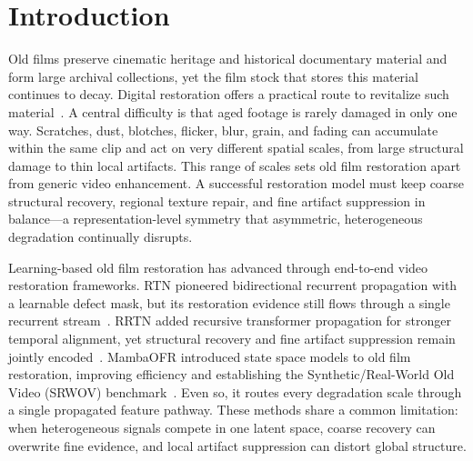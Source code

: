 \section{Introduction}
\label{sec:introduction}

Old films preserve cinematic heritage and historical documentary material and form large archival collections, yet the film stock that stores this material continues to decay. Digital restoration offers a practical route to revitalize such material~\cite{iizuka2019deepremaster}. A central difficulty is that aged footage is rarely damaged in only one way. Scratches, dust, blotches, flicker, blur, grain, and fading can accumulate within the same clip and act on very different spatial scales, from large structural damage to thin local artifacts. This range of scales sets old film restoration apart from generic video enhancement. A successful restoration model must keep coarse structural recovery, regional texture repair, and fine artifact suppression in balance---a representation-level symmetry that asymmetric, heterogeneous degradation continually disrupts.

Learning-based old film restoration has advanced through end-to-end video restoration frameworks. RTN pioneered bidirectional recurrent propagation with a learnable defect mask, but its restoration evidence still flows through a single recurrent stream~\cite{wan2022rtn}. RRTN added recursive transformer propagation for stronger temporal alignment, yet structural recovery and fine artifact suppression remain jointly encoded~\cite{lin2024rrtn}. MambaOFR introduced state space models to old film restoration, improving efficiency and establishing the Synthetic/Real-World Old Video (SRWOV) benchmark~\cite{mao2025mambaofr,gu2024mamba,guo2024mambair}. Even so, it routes every degradation scale through a single propagated feature pathway. These methods share a common limitation: when heterogeneous signals compete in one latent space, coarse recovery can overwrite fine evidence, and local artifact suppression can distort global structure.

